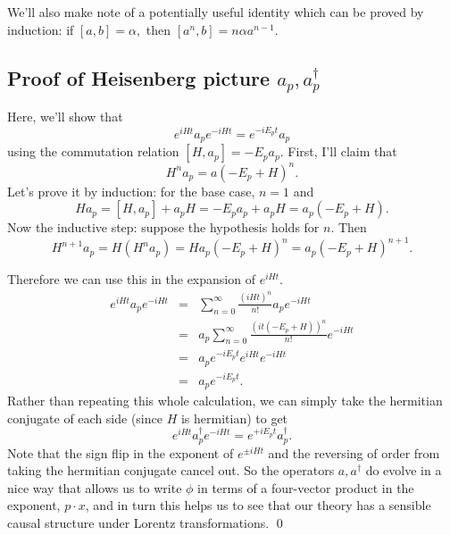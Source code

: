 We'll also make note of a potentially useful identity which can be proved by induction: if $[a,b]=\alpha,$ then $[a^n,b]=n\alpha a^{n-1}.$

\subsection*{Proof of Heisenberg picture $a_p,a_p^\dagger$}
Here, we'll show that
$$e^{iHt}a_p e^{-iHt}= e^{-iE_pt} a_p$$
using the commutation relation $[H,a_p]=-E_p a_p.$
First, I'll claim that 
$$H^n a_p =a (-E_p + H)^n.$$
Let's prove it by induction: for the base case, $n=1$ and
$$H a_p = [H,a_p]+ a_p H = -E_p a_p + a_p H = a_p (-E_p+H).$$
Now the inductive step: suppose the hypothesis holds for $n$. Then
$$H^{n+1} a_p = H (H^n a_p)= Ha_p (-E_p+H)^n = a_p (-E_p+H)^{n+1}.$$

Therefore we can use this in the expansion of $e^{iHt}$.
\begin{eqnarray*}
e^{iHt}a_p e^{-iHt}&=& \sum_{n=0}^\infty \frac{(iHt)^n}{n!} a_p e^{-iHt}\\
&=& a_p \sum_{n=0}^\infty \frac{ (it(-E_p +H))^n}{n!} e^{-iHt}\\
&=& a_p e^{-iE_p t} e^{iHt} e^{-iHt}\\
&=& a_p e^{-iE_pt}.
\end{eqnarray*}
Rather than repeating this whole calculation, we can simply take the hermitian conjugate of each side (since $H$ is hermitian) to get
$$e^{iHt} a_p^\dagger e^{-iHt} = e^{+iE_p t} a_p^\dagger.$$
Note that the sign flip in the exponent of $e^{\pm iHt}$ and the reversing of order from taking the hermitian conjugate cancel out. So the operators $a,a^\dagger$ do evolve in a nice way that allows us to write $\phi$ in terms of a four-vector product in the exponent, $p\cdot x$, and in turn this helps us to see that our theory has a sensible causal structure under Lorentz transformations. \qed